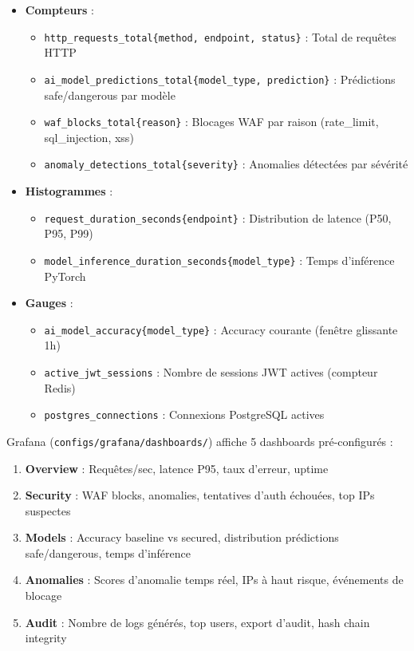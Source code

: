 \begin{itemize}
    \item \textbf{Compteurs} :
    \begin{itemize}
        \item \texttt{http\_requests\_total\{method, endpoint, status\}} : Total de requêtes HTTP
        \item \texttt{ai\_model\_predictions\_total\{model\_type, prediction\}} : Prédictions safe/dangerous par modèle
        \item \texttt{waf\_blocks\_total\{reason\}} : Blocages WAF par raison (rate\_limit, sql\_injection, xss)
        \item \texttt{anomaly\_detections\_total\{severity\}} : Anomalies détectées par sévérité
    \end{itemize}
    \item \textbf{Histogrammes} :
    \begin{itemize}
        \item \texttt{request\_duration\_seconds\{endpoint\}} : Distribution de latence (P50, P95, P99)
        \item \texttt{model\_inference\_duration\_seconds\{model\_type\}} : Temps d'inférence PyTorch
    \end{itemize}
    \item \textbf{Gauges} :
    \begin{itemize}
        \item \texttt{ai\_model\_accuracy\{model\_type\}} : Accuracy courante (fenêtre glissante 1h)
        \item \texttt{active\_jwt\_sessions} : Nombre de sessions JWT actives (compteur Redis)
        \item \texttt{postgres\_connections} : Connexions PostgreSQL actives
    \end{itemize}
\end{itemize}

Grafana (\texttt{configs/grafana/dashboards/}) affiche 5 dashboards pré-configurés :

\begin{enumerate}
    \item \textbf{Overview} : Requêtes/sec, latence P95, taux d'erreur, uptime
    \item \textbf{Security} : WAF blocks, anomalies, tentatives d'auth échouées, top IPs suspectes
    \item \textbf{Models} : Accuracy baseline vs secured, distribution prédictions safe/dangerous, temps d'inférence
    \item \textbf{Anomalies} : Scores d'anomalie temps réel, IPs à haut risque, événements de blocage
    \item \textbf{Audit} : Nombre de logs générés, top users, export d'audit, hash chain integrity
\end{enumerate}

